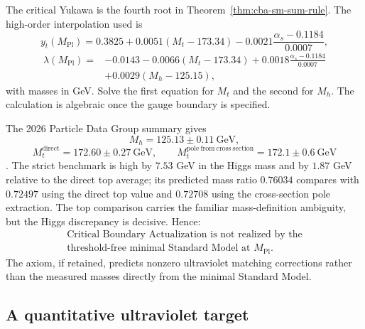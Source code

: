 \begin{proofsketch}
The critical Yukawa is the fourth root in
Theorem~\ref{thm:cba-sm-sum-rule}.  The high-order interpolation used is
\[
 y_t(M_{\mathrm{Pl}})
 =0.3825+0.0051(M_t-173.34)
 -0.0021\frac{\alpha_s-0.1184}{0.0007},
\]
\[
\begin{aligned}
 \lambda(M_{\mathrm{Pl}})
={}&-0.0143-0.0066(M_t-173.34)
 +0.0018\frac{\alpha_s-0.1184}{0.0007}\\
&+0.0029(M_h-125.15),
\end{aligned}
\]
with masses in GeV.  Solve the first equation for $M_t$ and the second for $M_h$.
The calculation is algebraic once the gauge boundary is specified.
\end{proofsketch}

\begin{proposition}
\label{prop:cba-strict-verdict}
The 2026 Particle Data Group summary gives
\[
 M_h=125.13\pm0.11\ \mathrm{GeV},
\]
\[
 M_t^{\mathrm{direct}}=172.60\pm0.27\ \mathrm{GeV},
 \qquad
 M_t^{\mathrm{pole\ from\ cross\ section}}=172.1\pm0.6\ \mathrm{GeV}
\]
\cite{pdg2026}.  The strict benchmark is high by $7.53$ GeV in the Higgs mass and
by $1.87$ GeV relative to the direct top average; its predicted mass ratio
$0.76034$ compares with $0.72497$ using the direct top value and $0.72708$ using
the cross-section pole extraction.  The top comparison carries the familiar
mass-definition ambiguity, but the Higgs discrepancy is decisive.  Hence:
\[
 \boxed{
 \begin{gathered}
 \text{Critical Boundary Actualization is not realized by the}\\
 \text{threshold-free minimal Standard Model at }M_{\mathrm{Pl}}.
 \end{gathered}}
\]
The axiom, if retained, predicts nonzero ultraviolet matching corrections rather
than the measured masses directly from the minimal Standard Model.
\end{proposition}

\subsection{A quantitative ultraviolet target}

